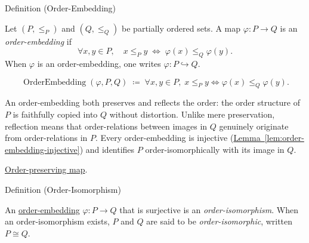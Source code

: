 \begin{definitionbox}{Definition (Order-Embedding)}
\begin{definition}
\label{def:order-embedding}
Let $(P, \leq_P)$ and $(Q, \leq_Q)$ be partially ordered sets.  A map
$\varphi : P \to Q$ is an \emph{order-embedding} if
\[
\forall x, y \in P, \quad
x \leq_P y \;\Longleftrightarrow\; \varphi(x) \leq_Q \varphi(y).
\]
When $\varphi$ is an order-embedding, one writes $\varphi : P \hookrightarrow Q$.
\end{definition}
\end{definitionbox}

\begin{remark*}
\[
\operatorname{OrderEmbedding}(\varphi, P, Q)
\;\coloneqq\;
\forall x, y \in P,\;
x \leq_P y \Longleftrightarrow \varphi(x) \leq_Q \varphi(y).
\]
\end{remark*}

\begin{remark*}[Interpretation]
An order-embedding both preserves and reflects the order: the order
structure of $P$ is faithfully copied into $Q$ without distortion.
Unlike mere preservation, reflection means that order-relations between
images in $Q$ genuinely originate from order-relations in $P$.  Every
order-embedding is injective
(\hyperref[lem:order-embedding-injective]{Lemma~\ref*{lem:order-embedding-injective}})
and identifies $P$ order-isomorphically with its image in $Q$.
\end{remark*}

\begin{remark*}[Dependencies]
\hyperref[def:order-preserving-map]{Order-preserving map}.
\end{remark*}


\begin{definitionbox}{Definition (Order-Isomorphism)}
\begin{definition}
\label{def:order-isomorphism}
An \hyperref[def:order-embedding]{order-embedding} $\varphi : P \to Q$
that is surjective is an \emph{order-isomorphism}.  When an
order-isomorphism exists, $P$ and $Q$ are said to be
\emph{order-isomorphic}, written $P \cong Q$.
\end{definition}
\end{definitionbox}

